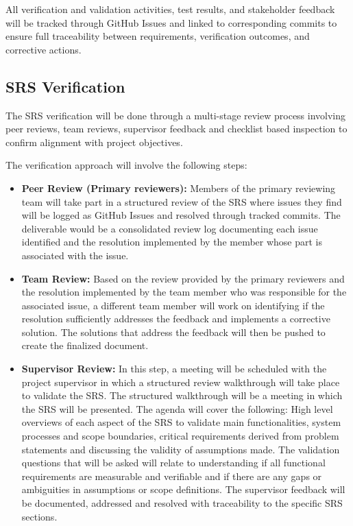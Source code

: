 \documentclass[12pt, titlepage]{article}
\begin{document}
All verification and validation activities, test results, and stakeholder feedback will be tracked through GitHub Issues and linked to corresponding commits to ensure full traceability between requirements, verification outcomes, and corrective actions.


\subsection{SRS Verification}
The SRS verification will be done through a multi-stage review process involving peer reviews, team reviews, supervisor feedback and checklist based inspection to confirm alignment with project objectives.

The verification approach will involve the following steps:
\begin{itemize}
    \item \textbf{Peer Review (Primary reviewers):} Members of the primary reviewing team will take part in a structured review of the SRS where issues they find will be logged as GitHub Issues and resolved through tracked commits. The deliverable would be a consolidated review log documenting each issue identified and the resolution implemented by the member whose part is associated with the issue.
    \item \textbf{Team Review:} Based on the review provided by the primary reviewers and the resolution implemented by the team member who was responsible for the associated issue, a different team member will work on identifying if the resolution sufficiently addresses the feedback and implements a corrective solution. The solutions that address the feedback will then be pushed to create the finalized document.
    \item \textbf{Supervisor Review:} In this step, a meeting will be scheduled with the project supervisor in which a structured review walkthrough will take place to validate the SRS. The structured walkthrough will be a meeting in which the SRS will be presented. The agenda will cover the following: High level overviews of each aspect of the SRS to validate main functionalities, system processes and scope boundaries, critical requirements derived from problem statements and discussing the validity of assumptions made. The validation questions that will be asked will relate to understanding if all functional requirements are measurable and verifiable and if there are any gaps or ambiguities in assumptions or scope definitions. The supervisor feedback will be documented, addressed and resolved with traceability to the specific SRS sections.

\end{itemize}
\end{document}
